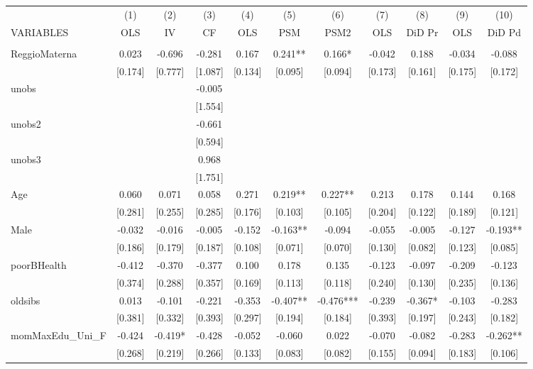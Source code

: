 \documentclass[]{article}
\begin{document}
\begin{tabular}{lcccccccccc} \hline
 & (1) & (2) & (3) & (4) & (5) & (6) & (7) & (8) & (9) & (10) \\
VARIABLES & OLS & IV & CF & OLS & PSM & PSM2 & OLS & DiD Pr & OLS & DiD Pd \\ \hline
 &  &  &  &  &  &  &  &  &  &  \\
ReggioMaterna & 0.023 & -0.696 & -0.281 & 0.167 & 0.241** & 0.166* & -0.042 & 0.188 & -0.034 & -0.088 \\
 & [0.174] & [0.777] & [1.087] & [0.134] & [0.095] & [0.094] & [0.173] & [0.161] & [0.175] & [0.172] \\
unobs &  &  & -0.005 &  &  &  &  &  &  &  \\
 &  &  & [1.554] &  &  &  &  &  &  &  \\
unobs2 &  &  & -0.661 &  &  &  &  &  &  &  \\
 &  &  & [0.594] &  &  &  &  &  &  &  \\
unobs3 &  &  & 0.968 &  &  &  &  &  &  &  \\
 &  &  & [1.751] &  &  &  &  &  &  &  \\
Age & 0.060 & 0.071 & 0.058 & 0.271 & 0.219** & 0.227** & 0.213 & 0.178 & 0.144 & 0.168 \\
 & [0.281] & [0.255] & [0.285] & [0.176] & [0.103] & [0.105] & [0.204] & [0.122] & [0.189] & [0.121] \\
Male & -0.032 & -0.016 & -0.005 & -0.152 & -0.163** & -0.094 & -0.055 & -0.005 & -0.127 & -0.193** \\
 & [0.186] & [0.179] & [0.187] & [0.108] & [0.071] & [0.070] & [0.130] & [0.082] & [0.123] & [0.085] \\
poorBHealth & -0.412 & -0.370 & -0.377 & 0.100 & 0.178 & 0.135 & -0.123 & -0.097 & -0.209 & -0.123 \\
 & [0.374] & [0.288] & [0.357] & [0.169] & [0.113] & [0.118] & [0.240] & [0.130] & [0.235] & [0.136] \\
oldsibs & 0.013 & -0.101 & -0.221 & -0.353 & -0.407** & -0.476*** & -0.239 & -0.367* & -0.103 & -0.283 \\
 & [0.381] & [0.332] & [0.393] & [0.297] & [0.194] & [0.184] & [0.393] & [0.197] & [0.243] & [0.182] \\
momMaxEdu\_Uni\_F & -0.424 & -0.419* & -0.428 & -0.052 & -0.060 & 0.022 & -0.070 & -0.082 & -0.283 & -0.262** \\
 & [0.268] & [0.219] & [0.266] & [0.133] & [0.083] & [0.082] & [0.155] & [0.094] & [0.183] & [0.106] \\

\end{tabular}
\end{document}

